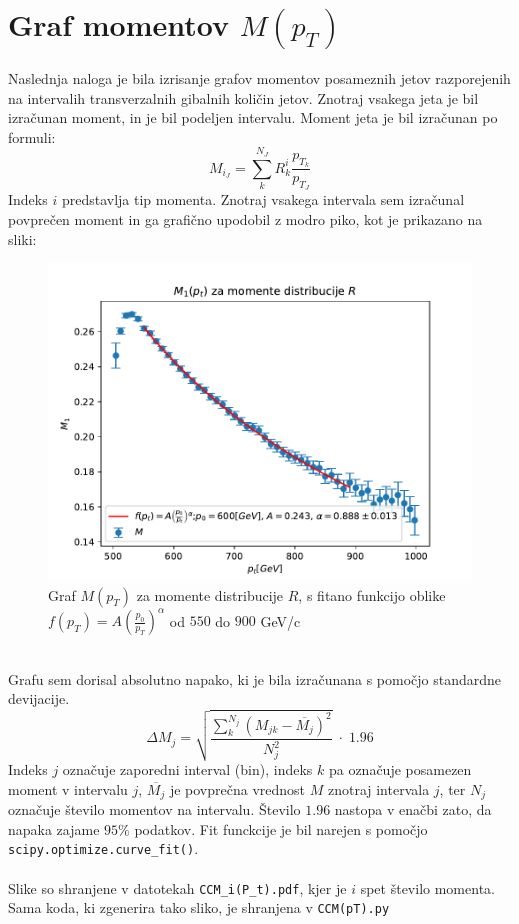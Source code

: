 \section{Graf momentov $M(p_T)$}
Naslednja naloga je bila izrisanje grafov momentov posameznih jetov razporejenih
na intervalih transverzalnih gibalnih količin jetov. Znotraj vsakega jeta je bil izračunan moment,
in je bil podeljen intervalu. 
Moment jeta je bil izračunan po formuli:
\begin{equation}
    M_{i_J} = \sum_{k}^{N_J}R_k^i \frac{p_{T_k}}{p_{T_J}}
\end{equation}
Indeks $i$ predstavlja tip momenta.
Znotraj vsakega intervala sem izračunal povprečen moment in ga 
grafično upodobil z modro piko, kot je prikazano na sliki: 
\begin{figure}[h]
    \begin{center}
        \includegraphics[width=13cm]{sections/section3/figures/CCM_1(P_t).pdf}
        \caption{Graf $M(p_T)$ za momente distribucije $R$, s fitano funkcijo oblike $f(p_T) = A\left(\frac{p_0}{p_T}\right)^\alpha$ od $550$ do $900$ GeV/c}
        \label{slika 4}
    \end{center}
\end{figure}
\\
Grafu sem dorisal absolutno napako, ki je bila izračunana s pomočjo standardne
devijacije. 
\begin{equation}
    \Delta M_{j} = \sqrt{\frac{\sum_{k}^{N_j} \left(M_{jk} - \overline{M_j}\right)^2}{N_j^2}}\;\cdot\; 1.96
\end{equation}
Indeks $j$ označuje zaporedni interval (bin), indeks $k$ pa označuje posamezen moment v intervalu $j$,
$\overline{M_j}$ je povprečna vrednost $M$ znotraj intervala $j$, ter $N_j$
označuje število momentov na intervalu. Število $1.96$ nastopa v enačbi zato,
da napaka zajame $95\%$ podatkov.
Fit funckcije je bil narejen s pomočjo \verb|scipy.optimize.curve_fit()|.
\\
\\
Slike so shranjene v datotekah 
\verb|CCM_i(P_t).pdf|, kjer je $i$ spet število momenta. Sama koda, ki zgenerira tako sliko, je shranjena v
\verb|CCM(pT).py|
